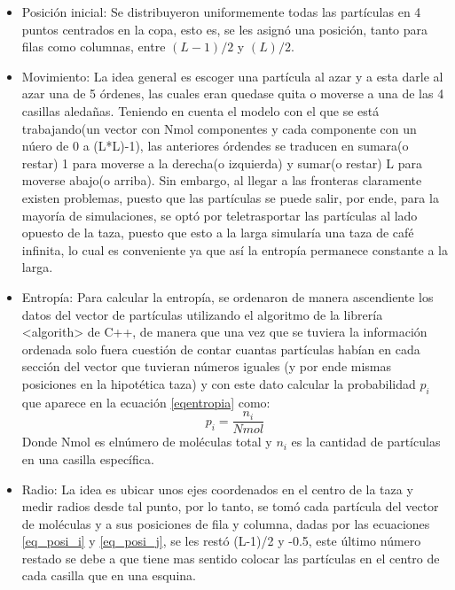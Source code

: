 \documentclass{article}
\begin{document}
\begin{itemize}
    \item Posición inicial: Se distribuyeron uniformemente todas las partículas en 4 puntos centrados en la copa, esto es, se les asignó una posición, tanto para filas como columnas, entre $(L-1)/2$ y $(L)/2$.
    \item Movimiento: La idea general es escoger una partícula al azar y a esta darle al azar una de 5 órdenes, las cuales eran quedase quita o moverse a una de las 4 casillas aledañas. Teniendo en cuenta el modelo con el que se está trabajando(un vector con Nmol componentes y cada componente con un núero de 0 a (L*L)-1), las anteriores órdendes se traducen en sumara(o restar) 1 para moverse a la derecha(o izquierda) y sumar(o restar) L para moverse abajo(o arriba). Sin embargo, al llegar a las fronteras claramente existen problemas, puesto que las partículas se puede salir, por ende, para la mayoría de simulaciones, se optó por teletrasportar las partículas al lado opuesto de la taza, puesto que esto a la larga simularía una taza de café infinita, lo cual es conveniente ya que así la entropía permanece constante a la larga.
    \item Entropía: Para calcular la entropía, se ordenaron de manera ascendiente los datos del vector de partículas utilizando el algoritmo de la librería <algorith> de C++, de manera que una vez que se tuviera la información ordenada solo fuera cuestión de contar cuantas partículas habían en cada sección del vector que tuvieran números iguales (y por ende mismas posiciones en la hipotética taza) y con este dato calcular la probabilidad $p_i$ que aparece en la ecuación \ref{eqentropia} como:
        \begin{equation}
            p_i=\frac{n_{i}}{Nmol}
        \end{equation}
    Donde Nmol es elnúmero de moléculas total y $n_i$ es la cantidad de partículas en una casilla específica.
    \item Radio: La idea es ubicar unos ejes coordenados en el centro de la taza y medir radios desde tal punto, por lo tanto, se tomó cada partícula del vector de moléculas y a sus posiciones de fila y columna, dadas por las ecuaciones \ref{eq_posi_i} y \ref{eq_posi_j}, se les restó (L-1)/2 y -0.5, este último número restado se debe a que tiene mas sentido colocar las partículas en el centro de cada casilla que en una esquina.
    

\end{itemize}
\end{document}
